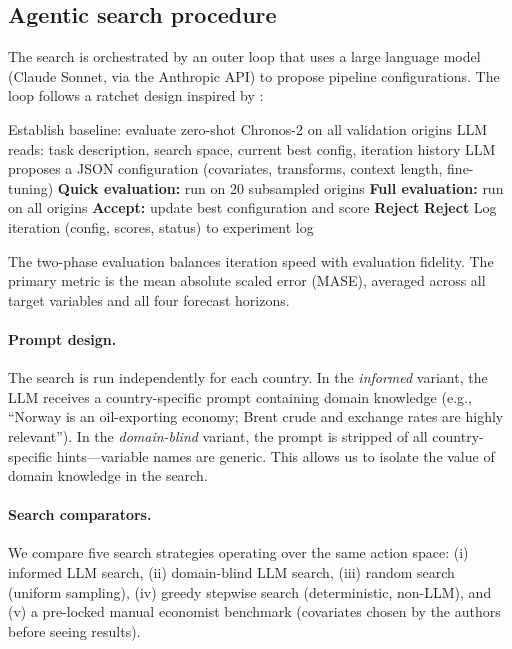 \documentclass[12pt,a4paper]{article}
\begin{document}
\subsection{Agentic search procedure}
\label{sec:search}

The search is orchestrated by an outer loop that uses a large language model (Claude Sonnet, via the Anthropic API) to propose pipeline configurations. The loop follows a ratchet design inspired by \citet{karpathy2026autoresearch}:

\begin{algorithm}[H]
\caption{LLM-guided pipeline search}
\label{alg:search}
\begin{algorithmic}[1]
\State Establish baseline: evaluate zero-shot Chronos-2 on all \nValOrigins{} validation origins
    \State LLM reads: task description, search space, current best config, iteration history
    \State LLM proposes a JSON configuration (covariates, transforms, context length, fine-tuning)
    \State \textbf{Quick evaluation:} run on 20 subsampled origins
        \State \textbf{Full evaluation:} run on all \nValOrigins{} origins
            \State \textbf{Accept:} update best configuration and score
        \Else
            \State \textbf{Reject}
        \EndIf
    \Else
        \State \textbf{Reject}
    \EndIf
    \State Log iteration (config, scores, status) to experiment log
\EndFor
\end{algorithmic}
\end{algorithm}

The two-phase evaluation balances iteration speed with evaluation fidelity. The primary metric is the mean absolute scaled error (MASE), averaged across all target variables and all four forecast horizons.

\paragraph{Prompt design.} The search is run independently for each country. In the \emph{informed} variant, the LLM receives a country-specific prompt containing domain knowledge (e.g., ``Norway is an oil-exporting economy; Brent crude and exchange rates are highly relevant''). In the \emph{domain-blind} variant, the prompt is stripped of all country-specific hints---variable names are generic. This allows us to isolate the value of domain knowledge in the search.

\paragraph{Search comparators.} We compare five search strategies operating over the same action space: (i) informed LLM search, (ii) domain-blind LLM search, (iii) random search (uniform sampling), (iv) greedy stepwise search (deterministic, non-LLM), and (v) a pre-locked manual economist benchmark (covariates chosen by the authors before seeing results).
\end{document}
